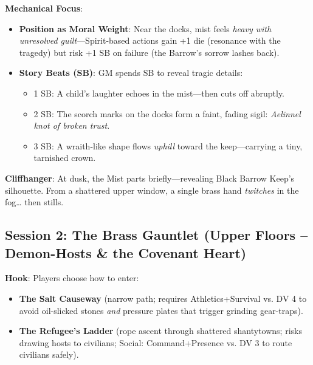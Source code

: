 \documentclass[12pt]{article}
\begin{document}
\textbf{Mechanical Focus}:
\begin{itemize}
  \item \textbf{Position as Moral Weight}: Near the docks, mist feels \textit{heavy with unresolved guilt}---Spirit-based actions gain +1 die (resonance with the tragedy) but risk +1 SB on failure (the Barrow's sorrow lashes back).
  \item \textbf{Story Beats (SB)}: GM spends SB to reveal tragic details:
  \begin{itemize}
    \item 1 SB: A child's laughter echoes in the mist---then cuts off abruptly.
    \item 2 SB: The scorch marks on the docks form a faint, fading sigil: \textit{Aelinnel knot of broken trust}.
    \item 3 SB: A wraith-like shape flows \textit{uphill} toward the keep---carrying a tiny, tarnished crown.
  \end{itemize}
\end{itemize}

\textbf{Cliffhanger}: At dusk, the Mist parts briefly---revealing Black Barrow Keep's silhouette. From a shattered upper window, a single brass hand \textit{twitches} in the fog\ldots{} then stills.

\subsection{Session 2: The Brass Gauntlet (Upper Floors -- Demon-Hosts \& the Covenant Heart)}
\textbf{Hook}: Players choose how to enter:
\begin{itemize}
  \item \textbf{The Salt Causeway} (narrow path; requires Athletics+Survival vs. DV 4 to avoid oil-slicked stones \textit{and} pressure plates that trigger grinding gear-traps).
  \item \textbf{The Refugee's Ladder} (rope ascent through shattered shantytowns; risks drawing hosts to civilians; Social: Command+Presence vs. DV 3 to route civilians safely).
\end{itemize}
\end{document}

